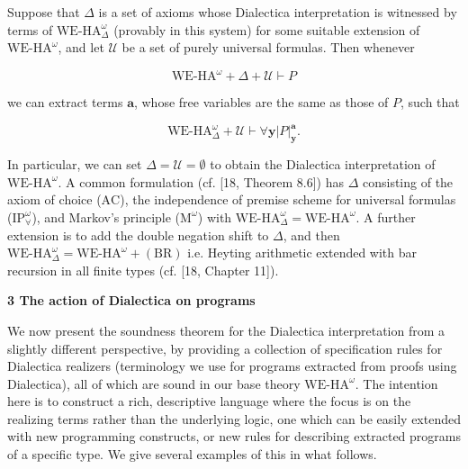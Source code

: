  
Suppose that $\Delta$ is a set of axioms whose Dialectica interpretation is witnessed by terms of $\mathrm{WE}\mbox{-}\mathrm{HA}^{\omega}_{\Delta}$ (provably in this system) for some suitable extension of $\mathrm{WE}\mbox{-}\mathrm{HA}^{\omega}$, and let $\mathcal{U}$ be a set of purely universal formulas. Then whenever\par
  
\par  \quad  \[\mathrm{WE}\mbox{-}\mathrm{HA}^{\omega}+\Delta+\mathcal{U}\vdash P\]\quad  \quad  
  
we can extract terms $\bm{a}$, whose free variables are the same as those of $P$, such that\par
  
\par  \quad  \[\mathrm{WE}\mbox{-}\mathrm{HA}^{\omega}_{\Delta}+\mathcal{U}\vdash\forall\bm{y}|{P}|^{\bm{a}}_{\bm{y}}.\]\quad  \quad  
  
 
 
 
In particular, we can set $\Delta=\mathcal{U}=\emptyset$ to obtain the Dialectica interpretation of $\mathrm{WE}\mbox{-}\mathrm{HA}^{\omega}$. A common formulation (cf. [18, Theorem 8.6]) has $\Delta$ consisting of the axiom of choice ($\mathrm{AC}$), the independence of premise scheme for universal formulas ($\mathrm{IP}^{\omega}_{\forall}$), and Markov’s principle ($\mathrm{M}^{\omega}$) with $\mathrm{WE}\mbox{-}\mathrm{HA}^{\omega}_{\Delta}=\mathrm{WE}\mbox{-}\mathrm{HA}^{\omega}$. A further extension is to add the double negation shift to $\Delta$, and then $\mathrm{WE}\mbox{-}\mathrm{HA}^{\omega}_{\Delta}=\mathrm{WE}\mbox{-}\mathrm{HA}^{\omega}+(\mathrm{BR})$ i.e. Heyting arithmetic extended with bar recursion in all finite types (cf. [18, Chapter 11]).\par
 
 
 


 
\par\medskip\noindent\textbf{3 The action of Dialectica on programs}\par
 
 
We now present the soundness theorem for the Dialectica interpretation from a slightly different perspective, by providing a collection of specification rules for Dialectica realizers (terminology we use for programs extracted from proofs using Dialectica), all of which are sound in our base theory $\mathrm{WE}\mbox{-}\mathrm{HA}^{\omega}$. The intention here is to construct a rich, descriptive language where the focus is on the realizing terms rather than the underlying logic, one which can be easily extended with new programming constructs, or new rules for describing extracted programs of a specific type. We give several examples of this in what follows.\par
 
